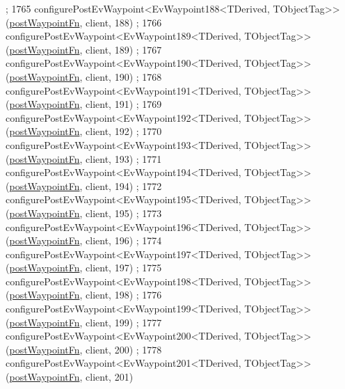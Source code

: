 \begin{DoxyCode}
      ;
1765     configurePostEvWaypoint<EvWaypoint188<TDerived, TObjectTag>>(\hyperlink{classsmacc_1_1WaypointEventDispatcher_a6bccf6a93a827634b7b5e67ac0e4ec57}{postWaypointFn}, client, 188)
      ;
1766     configurePostEvWaypoint<EvWaypoint189<TDerived, TObjectTag>>(\hyperlink{classsmacc_1_1WaypointEventDispatcher_a6bccf6a93a827634b7b5e67ac0e4ec57}{postWaypointFn}, client, 189)
      ;
1767     configurePostEvWaypoint<EvWaypoint190<TDerived, TObjectTag>>(\hyperlink{classsmacc_1_1WaypointEventDispatcher_a6bccf6a93a827634b7b5e67ac0e4ec57}{postWaypointFn}, client, 190)
      ;
1768     configurePostEvWaypoint<EvWaypoint191<TDerived, TObjectTag>>(\hyperlink{classsmacc_1_1WaypointEventDispatcher_a6bccf6a93a827634b7b5e67ac0e4ec57}{postWaypointFn}, client, 191)
      ;
1769     configurePostEvWaypoint<EvWaypoint192<TDerived, TObjectTag>>(\hyperlink{classsmacc_1_1WaypointEventDispatcher_a6bccf6a93a827634b7b5e67ac0e4ec57}{postWaypointFn}, client, 192)
      ;
1770     configurePostEvWaypoint<EvWaypoint193<TDerived, TObjectTag>>(\hyperlink{classsmacc_1_1WaypointEventDispatcher_a6bccf6a93a827634b7b5e67ac0e4ec57}{postWaypointFn}, client, 193)
      ;
1771     configurePostEvWaypoint<EvWaypoint194<TDerived, TObjectTag>>(\hyperlink{classsmacc_1_1WaypointEventDispatcher_a6bccf6a93a827634b7b5e67ac0e4ec57}{postWaypointFn}, client, 194)
      ;
1772     configurePostEvWaypoint<EvWaypoint195<TDerived, TObjectTag>>(\hyperlink{classsmacc_1_1WaypointEventDispatcher_a6bccf6a93a827634b7b5e67ac0e4ec57}{postWaypointFn}, client, 195)
      ;
1773     configurePostEvWaypoint<EvWaypoint196<TDerived, TObjectTag>>(\hyperlink{classsmacc_1_1WaypointEventDispatcher_a6bccf6a93a827634b7b5e67ac0e4ec57}{postWaypointFn}, client, 196)
      ;
1774     configurePostEvWaypoint<EvWaypoint197<TDerived, TObjectTag>>(\hyperlink{classsmacc_1_1WaypointEventDispatcher_a6bccf6a93a827634b7b5e67ac0e4ec57}{postWaypointFn}, client, 197)
      ;
1775     configurePostEvWaypoint<EvWaypoint198<TDerived, TObjectTag>>(\hyperlink{classsmacc_1_1WaypointEventDispatcher_a6bccf6a93a827634b7b5e67ac0e4ec57}{postWaypointFn}, client, 198)
      ;
1776     configurePostEvWaypoint<EvWaypoint199<TDerived, TObjectTag>>(\hyperlink{classsmacc_1_1WaypointEventDispatcher_a6bccf6a93a827634b7b5e67ac0e4ec57}{postWaypointFn}, client, 199)
      ;
1777     configurePostEvWaypoint<EvWaypoint200<TDerived, TObjectTag>>(\hyperlink{classsmacc_1_1WaypointEventDispatcher_a6bccf6a93a827634b7b5e67ac0e4ec57}{postWaypointFn}, client, 200)
      ;
1778     configurePostEvWaypoint<EvWaypoint201<TDerived, TObjectTag>>(\hyperlink{classsmacc_1_1WaypointEventDispatcher_a6bccf6a93a827634b7b5e67ac0e4ec57}{postWaypointFn}, client, 201)

\end{DoxyCode}
